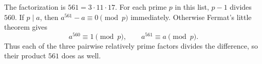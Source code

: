 The factorization is $561=3\cdot11\cdot17$. For each prime $p$ in this list, $p-1$ divides $560$. If $p\mid a$, then $a^{561}-a\equiv0\pmod p$ immediately. Otherwise Fermat's little theorem gives
\[
a^{560}\equiv1\pmod p,\qquad a^{561}\equiv a\pmod p.
\]
Thus each of the three pairwise relatively prime factors divides the difference, so their product $\boxed{561}$ does as well.
